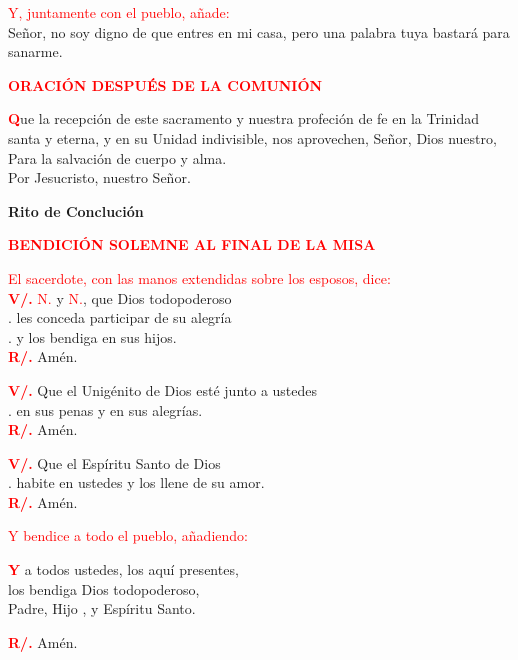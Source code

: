 \documentclass[12pt, letterpaper]{report}
\begin{document}
  \large{\textcolor{red}{Y, juntamente con el pueblo, a\~nade:}}\\
  \Large Se\~nor, no soy digno de que entres en mi casa, pero una palabra tuya bastar\'a para sanarme.

  \clearpage
  
  \Large {\bfseries \textcolor{red}{ORACI\'ON DESPU\'ES DE LA COMUNI\'ON}}

  \Large \lettrine[lines=2]{\bfseries \textcolor{red}{Q}}{}ue la recepci\'on de este sacramento y nuestra profeci\'on de fe en la Trinidad santa y eterna, y en su Unidad indivisible, nos aprovechen, Se\~nor, Dios nuestro, Para la salvaci\'on de cuerpo y alma.\\
  Por Jesucristo, nuestro Se\~nor.

  \begin{center}
  \Huge {\bfseries Rito de Concluci\'on}
  \end{center}

  \Large {\bfseries \textcolor{red}{BENDICI\'ON SOLEMNE AL FINAL DE LA MISA}} 

  \large{\textcolor{red}{El sacerdote, con las manos extendidas sobre los esposos, dice:}}\\
  \Large {\bfseries \textcolor{red}{V/.}} \hspace{0.5cm} \textcolor{red}{N.} y \textcolor{red}{N.}, que Dios todopoderoso\\
  .\hspace{1.5cm} les conceda participar de su alegr\'ia\\
  .\hspace{1.5cm} y los bendiga en sus hijos.\\
  \Large {\bfseries \textcolor{red}{R/.}} \hspace{0.5cm} Am\'en.

  \noindent
  \Large {\bfseries \textcolor{red}{V/.}} \hspace{0.5cm} Que el Unig\'enito de Dios est\'e junto a ustedes\\
  .\hspace{1.5cm} en sus penas y en sus alegr\'ias.\\
  \Large {\bfseries \textcolor{red}{R/.}} \hspace{0.5cm} Am\'en.

  \noindent
  \Large {\bfseries \textcolor{red}{V/.}} \hspace{0.5cm} Que el Esp\'iritu Santo de Dios\\
  .\hspace{1.5cm} habite en ustedes y los llene de su amor.\\
  \Large {\bfseries \textcolor{red}{R/.}} \hspace{0.5cm} Am\'en.

  \large{\textcolor{red}{Y bendice a todo el pueblo, a\~nadiendo:}}

  \Large \lettrine[lines=2]{\bfseries \textcolor{red}{Y}}{} a todos ustedes, los aqu\'i presentes,\\
  los bendiga Dios todopoderoso,\\
  Padre, Hijo \Huge{\textcolor{red}{}} \Large, y Esp\'iritu Santo.

  \Large {\bfseries \textcolor{red}{R/.}} \hspace{0.5cm} Am\'en.
\end{document}
